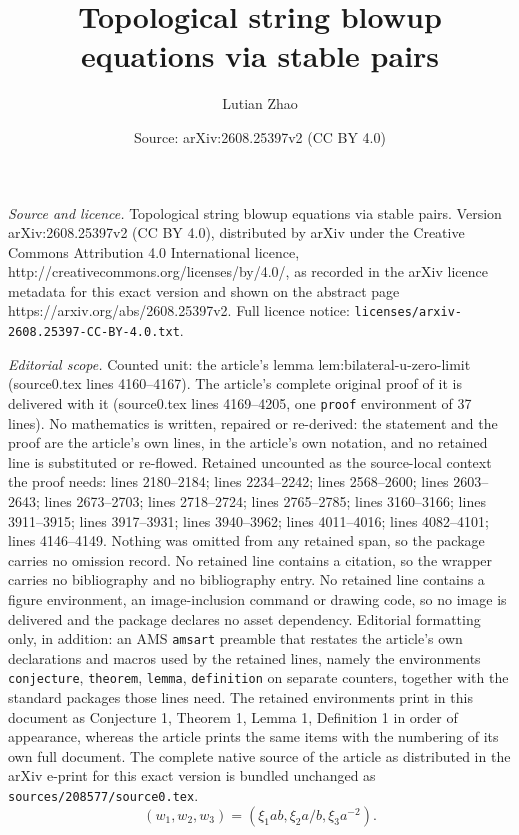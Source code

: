 \documentclass[10pt,a4paper]{amsart}
\title{Topological string blowup equations via stable pairs}
\author{Lutian Zhao}
\date{Source: arXiv:2608.25397v2 (CC BY 4.0)}
\begin{document}
\maketitle

\noindent\emph{Source and licence.} Topological string blowup equations via stable pairs. Version arXiv:2608.25397v2 (CC BY 4.0), distributed by arXiv under the Creative Commons Attribution 4.0 International licence, http://creativecommons.org/licenses/by/4.0/, as recorded in the arXiv licence metadata for this exact version and shown on the abstract page https://arxiv.org/abs/2608.25397v2. Full licence notice: \texttt{licenses/arxiv-2608.25397-CC-BY-4.0.txt}.\par\smallskip

\noindent\textit{Editorial scope.} Counted unit: the article's lemma lem:bilateral-u-zero-limit (source0.tex lines 4160--4167). The article's complete original proof of it is delivered with it (source0.tex lines 4169--4205, one \texttt{proof} environment of 37 lines). No mathematics is written, repaired or re-derived: the statement and the proof are the article's own lines, in the article's own notation, and no retained line is substituted or re-flowed.  Retained uncounted as the source-local context the proof needs: lines 2180--2184; lines 2234--2242; lines 2568--2600; lines 2603--2643; lines 2673--2703; lines 2718--2724; lines 2765--2785; lines 3160--3166; lines 3911--3915; lines 3917--3931; lines 3940--3962; lines 4011--4016; lines 4082--4101; lines 4146--4149.  Nothing was omitted from any retained span, so the package carries no omission record.  No retained line contains a citation, so the wrapper carries no bibliography and no bibliography entry.  No retained line contains a figure environment, an image-inclusion command or drawing code, so no image is delivered and the package declares no asset dependency.  Editorial formatting only, in addition: an AMS \texttt{amsart} preamble that restates the article's own declarations and macros used by the retained lines, namely the environments \texttt{conjecture}, \texttt{theorem}, \texttt{lemma}, \texttt{definition} on separate counters, together with the standard packages those lines need.  The retained environments print in this document as Conjecture 1, Theorem 1, Lemma 1, Definition 1 in order of appearance, whereas the article prints the same items with the numbering of its own full document.  The complete native source of the article as distributed in the arXiv e-print for this exact version is bundled unchanged as \texttt{sources/208577/source0.tex}.
\begin{equation}
 (w_1,w_2,w_3)
 =(\xi_1ab,\xi_2a/b,\xi_3a^{-2}).
\label{eq:P2-iterated-cocharacter}
\end{equation}
\end{document}
